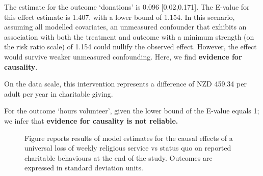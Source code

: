 \documentclass[
  singlecolumn]{article}
\begin{document}
The estimate for the outcome `donations' is 0.096 {[}0.02,0.171{]}. The
E-value for this effect estimate is 1.407, with a lower bound of 1.154.
In this scenario, assuming all modelled covariates, an unmeasured
confounder that exhibits an association with both the treatment and
outcome with a minimum strength (on the risk ratio scale) of 1.154 could
nullify the observed effect. However, the effect would survive weaker
unmeasured confounding. Here, we find \textbf{evidence for causality}.

On the data scale, this intervention represents a difference of NZD
459.34 per adult per year in charitable giving.

For the outcome `hours volunteer', given the lower bound of the E-value
equals 1; we infer that \textbf{evidence for causality is not reliable.}

\newpage{}

\begin{figure}


\caption{\label{fig-1_3}Figure reports results of model estimates for
the causal effects of a universal loss of weekly religious service vs
status quo on reported charitable behaviours at the end of the study.
Outcomes are expressed in standard deviation units.}

\end{figure}%
\end{document}

